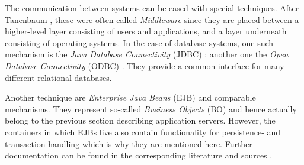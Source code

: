 The communication between systems can be eased with special techniques. After
Tanenbaum \cite{tanenbaum2002}, these were often called \emph{Middleware} since
they are placed between a higher-level layer consisting of users and applications,
and a layer underneath consisting of operating systems. In the case of database
systems, one such mechanism is the \emph{Java Database Connectivity} (JDBC)
\cite{hamilton, klute}; another one the \emph{Open Database Connectivity}
(ODBC) \cite[p. 170, 177]{zimmermann}. They provide a common interface for many
different relational databases.

Another technique are \emph{Enterprise Java Beans} (EJB) and comparable mechanisms.
They represent so-called \emph{Business Objects} (BO) and hence actually belong
to the previous section describing application servers. However, the containers
in which EJBs live also contain functionality for persistence- and transaction
handling which is why they are mentioned here. Further documentation can be found
in the corresponding literature \cite{gruhn} and sources \cite{blueprints, java}.
